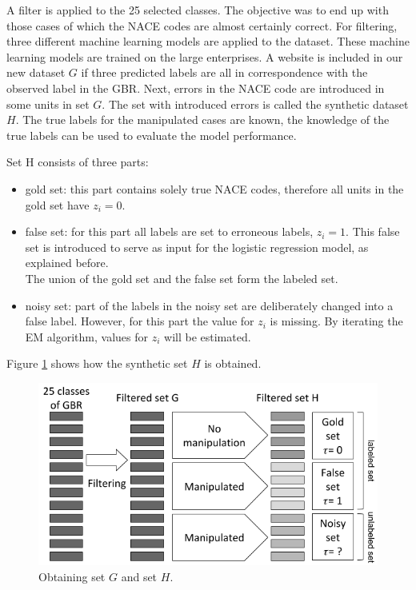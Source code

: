 \documentclass[12pt, a4paper, titlepage]{article}
\begin{document}
A filter is applied to the 25 selected classes. The objective was to end up with those cases of which the NACE codes are almost certainly correct. For filtering, three different machine learning models are applied to the dataset. These machine learning models are trained on the large enterprises. A website is included in our new dataset $G$ if three predicted labels are all in correspondence with the observed label in the GBR. Next, errors in the NACE code are introduced in some units in set $G$. The set with introduced errors is called the synthetic dataset $H$. The true labels for the manipulated cases are known, the knowledge of the true labels can be used to evaluate the model performance.

Set H consists of three parts:
\begin{itemize}
\item gold set: this part contains solely true NACE codes, therefore all units in the gold set have $z_i = 0$. 
\item false set: for this part all labels are set to erroneous labels, $z_i = 1$. This false set is introduced to serve as input for the logistic regression model, as explained before.
\\
The union of the gold set and the false set form the labeled set.
\item noisy set: part of the labels in the noisy set are deliberately changed into a false label. However, for this part the value for $z_i$ is missing. By iterating the EM algorithm, values for $z_i$ will be estimated.
\end{itemize}

Figure \ref{fig1} shows how the synthetic set $H$ is obtained.

\begin{figure}[h]
\includegraphics[width=\linewidth]{synthset}
\caption{Obtaining set $G$ and set $H$.}
\label{fig1}
\end{figure}
\end{document}
